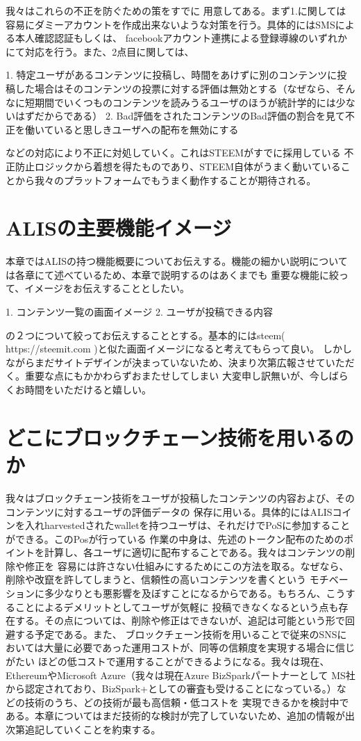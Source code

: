 \documentclass{jsarticle}
\begin{document}
我々はこれらの不正を防ぐための策をすでに
用意してある。まず1.に関しては容易にダミーアカウントを作成出来ないような対策を行う。具体的にはSMSによる本人確認認証もしくは、
facebookアカウント連携による登録導線のいずれかにて対応を行う。また、2点目に関しては、

1. 特定ユーザがあるコンテンツに投稿し、時間をあけずに別のコンテンツに投稿した場合はそのコンテンツの投票に対する評価は無効とする（なぜなら、そんなに短期間でいくつものコンテンツを読みうるユーザのほうが統計学的には少ないはずだからである）
2. Bad評価をされたコンテンツのBad評価の割合を見て不正を働いていると思しきユーザへの配布を無効にする

などの対応により不正に対処していく。これはSTEEMがすでに採用している
不正防止ロジックから着想を得たものであり、STEEM自体がうまく動いていることから我々のプラットフォームでもうまく動作することが期待される。
\section{ALISの主要機能イメージ}
本章ではALISの持つ機能概要についてお伝えする。機能の細かい説明については各章にて述べているため、本章で説明するのはあくまでも
重要な機能に絞って、イメージをお伝えすることとしたい。

1. コンテンツ一覧の画面イメージ
2. ユーザが投稿できる内容

の２つについて絞ってお伝えすることとする。基本的にはsteem( https://steemit.com )と似た画面イメージになると考えてもらって良い。
しかしながらまだサイトデザインが決まっていないため、決まり次第広報させていただく。重要な点にもかかわらずおまたせしてしまい
大変申し訳無いが、今しばらくお時間をいただけると嬉しい。
\section{どこにブロックチェーン技術を用いるのか}
我々はブロックチェーン技術をユーザが投稿したコンテンツの内容および、そのコンテンツに対するユーザの評価データの
保存に用いる。具体的にはALISコインを入れharvestedされたwalletを持つユーザは、それだけでPoSに参加することができる。このPosが行っている
作業の中身は、先述のトークン配布のためのポイントを計算し、各ユーザに適切に配布することである。我々はコンテンツの削除や修正を
容易には許さない仕組みにするためにこの方法を取る。なぜなら、削除や改竄を許してしまうと、信頼性の高いコンテンツを書くという
モチベーションに多少なりとも悪影響を及ぼすことになるからである。もちろん、こうすることによるデメリットとしてユーザが気軽に
投稿できなくなるという点も存在する。その点については、削除や修正はできないが、追記は可能という形で回避する予定である。また、
ブロックチェーン技術を用いることで従来のSNSにおいては大量に必要であった運用コストが、同等の信頼度を実現する場合に信じがたい
ほどの低コストで運用することができるようになる。我々は現在、EthereumやMicrosoft Azure（我々は現在Azure BizSparkパートナーとして
MS社から認定されており、BizSpark+としての審査も受けることになっている。）などの技術のうち、どの技術が最も高信頼・低コストを
実現できるかを検討中である。本章についてはまだ技術的な検討が完了していないため、追加の情報が出次第追記していくことを約束する。
\end{document}
